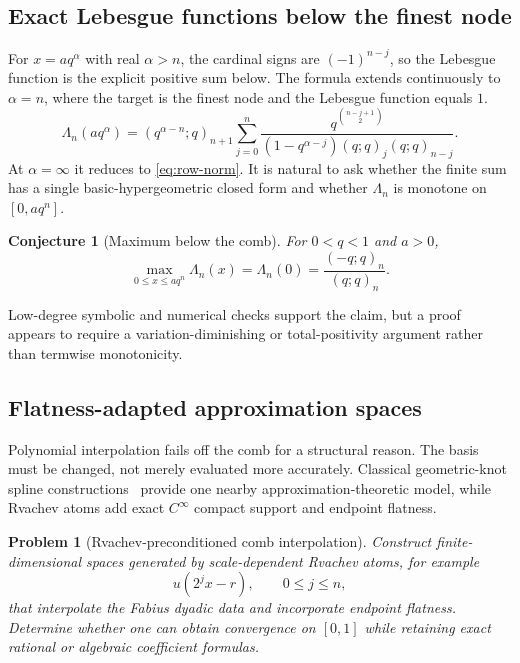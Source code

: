 \documentclass[11pt,a4paper,oneside]{article}
\newtheorem{conjecture}[conjecture]{Conjecture}
\newtheorem{problem}[problem]{Problem}
\theoremstyle{definition}
\theoremstyle{remark}
\begin{document}
\subsection{Exact Lebesgue functions below the finest node}

For $x=aq^\alpha$ with real $\alpha>n$, the cardinal signs are
$(-1)^{n-j}$, so the Lebesgue function is the explicit positive sum below.
The formula extends continuously to $\alpha=n$, where the target is the finest
node and the Lebesgue function equals $1$.
\begin{equation}
 \Lambda_n(aq^\alpha)=
 (q^{\alpha-n};q)_{n+1}
 \sum_{j=0}^n
 \frac{q^{\binom{n-j+1}{2}}}
 {(1-q^{\alpha-j})(q;q)_j(q;q)_{n-j}}.
 \label{eq:below-comb-lebesgue}
\end{equation}
At $\alpha=\infty$ it reduces to \eqref{eq:row-norm}.  It is natural to ask
whether the finite sum has a single basic-hypergeometric closed form and
whether $\Lambda_n$ is monotone on $[0,aq^n]$.

\begin{conjecture}[Maximum below the comb]
\label{conj:below-comb-lebesgue}
For $0<q<1$ and $a>0$,
\begin{equation}
 \max_{0\le x\le aq^n}\Lambda_n(x)=\Lambda_n(0)
 =\frac{(-q;q)_n}{(q;q)_n}.
 \label{eq:below-comb-max}
\end{equation}
\end{conjecture}

Low-degree symbolic and numerical checks support the claim, but a proof
appears to require a variation-diminishing or total-positivity argument rather
than termwise monotonicity.

\subsection{Flatness-adapted approximation spaces}

Polynomial interpolation fails off the comb for a structural reason.  The
basis must be changed, not merely evaluated more accurately.  Classical
geometric-knot spline constructions~\cite{KocakPhillips1994} provide one
nearby approximation-theoretic model, while Rvachev atoms add exact
$C^\infty$ compact support and endpoint flatness.

\begin{problem}[Rvachev-preconditioned comb interpolation]
\label{prob:rvachev-preconditioned}
Construct finite-dimensional spaces generated by scale-dependent Rvachev
atoms, for example
\[
 u(2^jx-r),\qquad 0\le j\le n,
\]
that interpolate the Fabius dyadic data and incorporate endpoint flatness.
Determine whether one can obtain convergence on $[0,1]$ while retaining exact
rational or algebraic coefficient formulas.
\end{problem}
\end{document}
